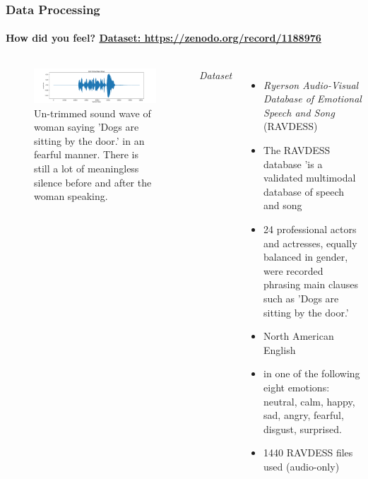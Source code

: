 \documentclass[10pt,usepdftitle=false,aspectratio=169]{beamer}
\begin{document}
\begin{frame}\frametitle{Data Processing}
    \framesubtitle{How did you feel?  \hspace*{30em} \href{https://zenodo.org/record/1188976}{Dataset: https://zenodo.org/record/1188976}}
    
    \vspace{1.5em}


  
	\begin{columns}
		\begin{figure}
			\centering
			\includegraphics[width=.8\textwidth]{figures/untr_raw_wave.pdf}
			\caption{Un-trimmed sound wave of woman saying 'Dogs are sitting by the door.' in an fearful manner. There is still a lot of meaningless silence before and after the woman speaking. }
			\label{fig:untrimmed sw}
		\end{figure}
\emph{Dataset}
\begin{itemize}
	\item \textit{Ryerson Audio-Visual Database of Emotional Speech and Song} (RAVDESS)
	\item The RAVDESS database 'is a validated multimodal database of speech and song 
	\item  24 professional actors and actresses, equally balanced in gender, were recorded phrasing main clauses such as  'Dogs are sitting by the door.' 
	\item  North American English 
	\item in one of the following eight emotions: neutral, calm, happy, sad, angry, fearful, disgust, surprised.
	\item  1440 RAVDESS files used  (audio-only) 
	
\end{itemize}
	\end{columns}


\end{frame}
\end{document}
